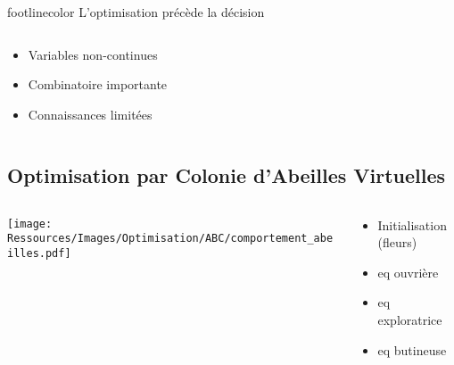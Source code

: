 \documentclass[xcolor=x11names, compress, 11pt]{beamer}
\newcommand{\addsubtitle}[1]{%
\begin{beamercolorbox}[sep=2pt,center,shadow=true,rounded=true]{footlinecolor}
    #1\par%
\end{beamercolorbox}%
}
\begin{document}
\begin{frame}[t]
    \addsubtitle{L’optimisation précède la décision}
    \vfill
    \begin{columns}
        \begin{column}{0.5\textwidth}
            \begin{center}
                \begin{itemize}
                    \item Variables non-continues
                    \item<2-> Combinatoire importante
                    \item<3-> Connaissances limitées
                \end{itemize}
            \end{center}
        \end{column}%
        \begin{column}{0.55\textwidth}
        \end{column}%
    \end{columns}%
    \vfill

\end{frame}




\subsection{Optimisation par Colonie d’Abeilles Virtuelles}
\begin{frame}[c]
    \vfill
    \centering
    \begin{columns}
        \begin{column}{0.65\textwidth}
            \raggedright
            \texttt{[image: Ressources/Images/Optimisation/ABC/comportement\_abeilles.pdf]}
        \end{column}%
        \begin{column}{0.4\textwidth}
            \raggedleft
            \begin{itemize}
                \item Initialisation (fleurs)
                \item eq ouvrière
                \item eq exploratrice
                \item eq butineuse
            \end{itemize}
        \end{column}%
    \end{columns}%
    \vfill

\end{frame}
\end{document}
